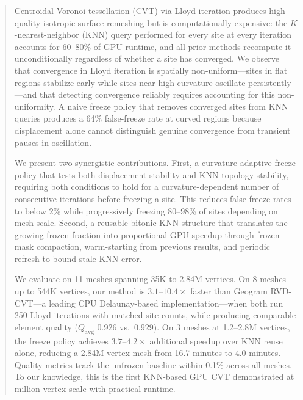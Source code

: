 \begin{abstract}
Centroidal Voronoi tessellation (CVT) via Lloyd iteration produces high-quality isotropic surface remeshing but is computationally expensive: the $K$-nearest-neighbor (KNN) query performed for every site at every iteration accounts for 60--80\% of GPU runtime, and all prior methods recompute it unconditionally regardless of whether a site has converged. We observe that convergence in Lloyd iteration is spatially non-uniform---sites in flat regions stabilize early while sites near high curvature oscillate persistently---and that detecting convergence reliably requires accounting for this non-uniformity. A naive freeze policy that removes converged sites from KNN queries produces a 64\% false-freeze rate at curved regions because displacement alone cannot distinguish genuine convergence from transient pauses in oscillation.

We present two synergistic contributions. First, a curvature-adaptive freeze policy that tests both displacement stability and KNN topology stability, requiring both conditions to hold for a curvature-dependent number of consecutive iterations before freezing a site. This reduces false-freeze rates to below 2\% while progressively freezing 80--98\% of sites depending on mesh scale. Second, a reusable bitonic KNN structure that translates the growing frozen fraction into proportional GPU speedup through frozen-mask compaction, warm-starting from previous results, and periodic refresh to bound stale-KNN error.

We evaluate on 11 meshes spanning 35K to 2.84M vertices. On 8 meshes up to 544K vertices, our method is $3.1$--$10.4\times$ faster than Geogram RVD-CVT---a leading CPU Delaunay-based implementation---when both run 250 Lloyd iterations with matched site counts, while producing comparable element quality ($Q_{\mathrm{avg}}$ 0.926 vs.\ 0.929). On 3 meshes at 1.2--2.8M vertices, the freeze policy achieves $3.7$--$4.2\times$ additional speedup over KNN reuse alone, reducing a 2.84M-vertex mesh from 16.7 minutes to 4.0 minutes. Quality metrics track the unfrozen baseline within 0.1\% across all meshes. To our knowledge, this is the first KNN-based GPU CVT demonstrated at million-vertex scale with practical runtime.
\end{abstract}
